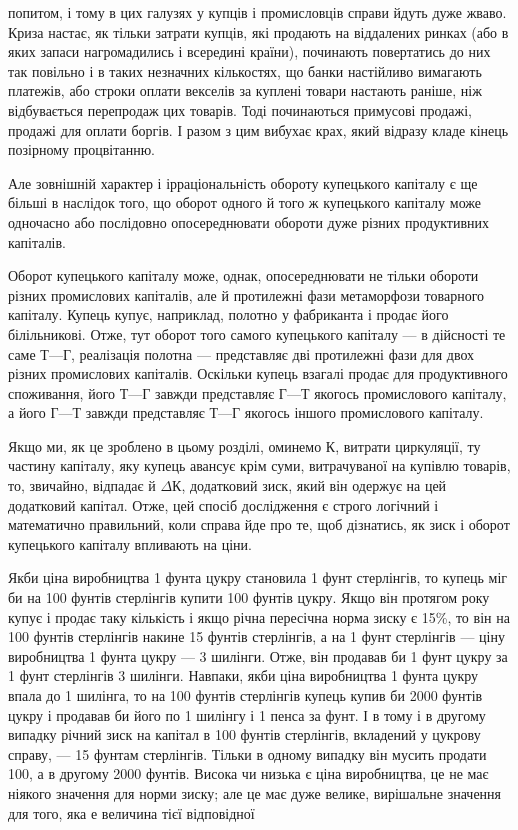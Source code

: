 \parcont{}  %
попитом, і тому в цих галузях у купців і промисловців справи
йдуть дуже жваво. Криза настає, як тільки затрати купців, які
продають на віддалених ринках (або в яких запаси нагромадились
і всередині країни), починають повертатись до них так
повільно і в таких незначних кількостях, що банки настійливо
вимагають платежів, або строки оплати векселів за куплені
товари настають раніше, ніж відбувається перепродаж цих
товарів. Тоді починаються примусові продажі, продажі для
оплати боргів. І разом з цим вибухає крах, який відразу кладе
кінець позірному процвітанню.

Але зовнішній характер і ірраціональність обороту купецького
капіталу є ще більші в наслідок того, що оборот одного й того ж
купецького капіталу може одночасно або послідовно опосереднювати
обороти дуже різних продуктивних капіталів.

Оборот купецького капіталу може, однак, опосереднювати
не тільки обороти різних промислових капіталів, але й протилежні
фази метаморфози товарного капіталу. Купець купує,
наприклад, полотно у фабриканта і продає його білільникові.
Отже, тут оборот того самого купецького капіталу — в дійсності
те саме $Т — Г$, реалізація полотна — представляє дві протилежні
фази для двох різних промислових капіталів. Оскільки
купець взагалі продає для продуктивного споживання, його
$Т — Г$ завжди представляє $Г — Т$ якогось промислового капіталу,
а його $Г — Т$ завжди представляє $Т — Г$ якогось іншого промислового
капіталу.

Якщо ми, як це зроблено в цьому розділі, оминемо $К$, витрати
циркуляції, ту частину капіталу, яку купець авансує крім
суми, витрачуваної на купівлю товарів, то, звичайно, відпадає
й $ΔК$, додатковий зиск, який він одержує на цей додатковий
капітал. Отже, цей спосіб дослідження є строго логічний і математично
правильний, коли справа йде про те, щоб дізнатись,
як зиск і оборот купецького капіталу впливають на ціни.

Якби ціна виробництва 1 фунта цукру становила 1 фунт
стерлінгів, то купець міг би на 100 фунтів стерлінгів купити
100 фунтів цукру. Якщо він протягом року купує і продає таку
кількість і якщо річна пересічна норма зиску є 15\%, то він
на 100 фунтів стерлінгів накине 15 фунтів стерлінгів, а на
1 фунт стерлінгів — ціну виробництва 1 фунта цукру — 3 шилінги.
Отже, він продавав би 1 фунт цукру за 1 фунт стерлінгів 3 шилінги.
Навпаки, якби ціна виробництва 1 фунта цукру впала до
1 шилінга, то на 100 фунтів стерлінгів купець купив би 2000 фунтів
цукру і продавав би його по 1 шилінгу і 1 пенса за фунт.
І в тому і в другому випадку річний зиск на капітал в 100 фунтів
стерлінгів, вкладений у цукрову справу, — 15 фунтам стерлінгів.
Тільки в одному випадку він мусить продати 100, а в другому
2000 фунтів. Висока чи низька є ціна виробництва, це не має
ніякого значення для норми зиску; але це має дуже велике,
вирішальне значення для того, яка е величина тієї відповідної
\parbreak{}  %
